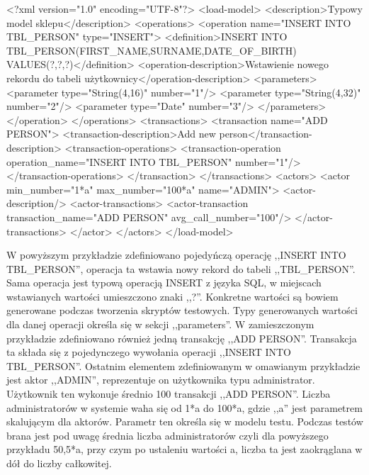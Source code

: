 \begin{codeblock}
<?xml version="1.0" encoding="UTF-8"?>
<load-model>
    <description>Typowy model sklepu</description>
    <operations>
        <operation name="INSERT INTO TBL_PERSON" type="INSERT">
            <definition>INSERT INTO TBL_PERSON(FIRST_NAME,SURNAME,DATE_OF_BIRTH) 
	    		VALUES(?,?,?)</definition>
            <operation-description>Wstawienie nowego rekordu do tabeli użytkownicy</operation-description>
            <parameters>
                <parameter type="String(4,16)" number="1"/>
                <parameter type="String(4,32)" number="2"/>
                <parameter type="Date" number="3"/>
            </parameters>
        </operation>
    </operations>
    <transactions>
        <transaction name="ADD PERSON">
            <transaction-description>Add new person</transaction-description>
            <transaction-operations>
                <transaction-operation operation_name="INSERT INTO TBL_PERSON" number="1"/>
            </transaction-operations>
        </transaction>
    </transactions>
    <actors>
        <actor min_number="1*a" max_number="100*a" name="ADMIN">
            <actor-description/>
            <actor-transactions>
                <actor-transaction transaction_name="ADD PERSON" avg_call_number="100"/>
            </actor-transactions>
        </actor>
    </actors>
</load-model>
\end{codeblock}
W powyższym przykładzie zdefiniowano pojedyńczą operację ,,INSERT INTO TBL\_PERSON'',
operacja ta wstawia nowy rekord do tabeli ,,TBL\_PERSON''. Sama operacja jest typową operacją INSERT
z języka SQL, w miejscach wstawianych wartości umieszczono znaki ,,?''. Konkretne wartości są bowiem generowane
podczas tworzenia skryptów testowych. Typy generowanych wartości dla danej operacji określa się w sekcji
,,parameters''. W zamieszczonym przykładzie zdefiniowano również jedną transakcję ,,ADD PERSON''.
Transakcja ta składa się z pojedynczego wywołania operacji ,,INSERT INTO TBL\_PERSON''.
Ostatnim elementem zdefiniowanym w omawianym przykładzie jest aktor ,,ADMIN'',
reprezentuje on użytkownika typu administrator. Użytkownik ten wykonuje średnio
100 transakcji ,,ADD PERSON''.
Liczba administratorów w systemie waha się od 1*a do 100*a, gdzie ,,a'' jest parametrem skalującym dla aktorów.
Parametr ten określa się w modelu testu. Podczas testów brana jest pod uwagę średnia liczba administratorów 
czyli dla powyższego przykładu 50,5*a, przy czym po ustaleniu wartości a, liczba ta jest zaokrąglana w dół
do liczby całkowitej.

